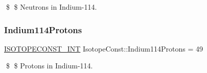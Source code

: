 \$ \$ Neutrons in Indium-\/114. \mbox{\label{group___isotope_const-_indium-_in114_ga3c3183d872328eca864b11eed5d0934d}} 
\subsubsection{\texorpdfstring{Indium114\+Protons}{Indium114Protons}}
{\footnotesize\ttfamily \mbox{\hyperlink{group___isotope_const-_macros_ga5f18360b3e99483a35c32d789e62621c}{I\+S\+O\+T\+O\+P\+E\+C\+O\+N\+S\+T\+\_\+\+I\+NT}} Isotope\+Const\+::\+Indium114\+Protons = 49}

\$ \$ Protons in Indium-\/114. 